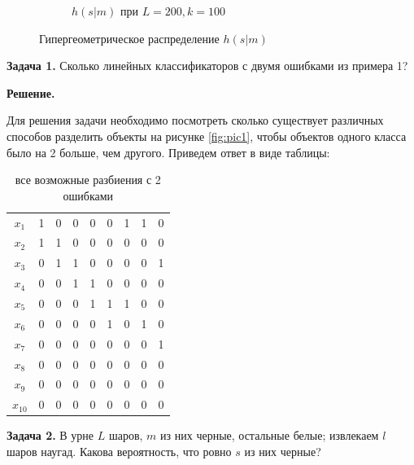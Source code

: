 \begin{figure}[hbt!]
\begin{subfigure}[t]{0.45\textwidth}
        \caption{$h(s|m)$ при $L=200, k=100$}
        \label{fig:pic4}
    \end{subfigure}
    \caption{Гипергеометрическое распределение $h(s|m)$}
\end{figure}

\textbf{Задача 1.} Сколько линейных классификаторов с двумя ошибками из примера 1?

\textbf{Решение.}

Для решения задачи необходимо посмотреть сколько существует различных способов разделить объекты на рисунке \ref{fig:pic1}, чтобы объектов одного класса было на 2 больше, чем другого. Приведем ответ в виде таблицы:

\begin{table}[hbt!]
    \begin{tabular}{c|cccccccc}
        $x_1$    & 1 & 0 & 0 & 0 & 0 & 1 & 1 & 0 \\
        $x_2$    & 1 & 1 & 0 & 0 & 0 & 0 & 0 & 0 \\
        $x_3$    & 0 & 1 & 1 & 0 & 0 & 0 & 0 & 1 \\
        $x_4$    & 0 & 0 & 1 & 1 & 0 & 0 & 0 & 0 \\
        $x_5$    & 0 & 0 & 0 & 1 & 1 & 1 & 0 & 0 \\
        $x_6$    & 0 & 0 & 0 & 0 & 1 & 0 & 1 & 0 \\
        $x_7$    & 0 & 0 & 0 & 0 & 0 & 0 & 0 & 1 \\
        $x_8$    & 0 & 0 & 0 & 0 & 0 & 0 & 0 & 0 \\
        $x_9$    & 0 & 0 & 0 & 0 & 0 & 0 & 0 & 0 \\
        $x_{10}$ & 0 & 0 & 0 & 0 & 0 & 0 & 0 & 0 \\
    \end{tabular}
    \caption{все возможные разбиения с 2 ошибками}
\end{table}

\textbf{Задача 2.} В урне $L$ шаров, $m$ из них черные, остальные белые; извлекаем $l$ шаров наугад. Какова вероятность, что ровно $s$ из них черные?

